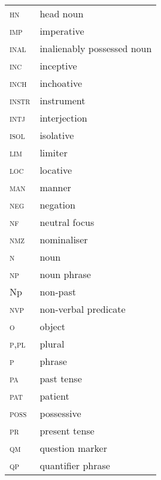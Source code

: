 \begin{multicols}{2}
\begin{tabular}{lp{4.5cm}}
\textsc{hn}          &                    head noun \\
\textsc{imp}         &                     imperative \\
\textsc{inal}        &                      inalienably possessed noun \\
\textsc{inc}         &                     inceptive \\
\textsc{inch}        &                      inchoative \\
\textsc{instr}       &                       instrument \\
\textsc{intj}        &                      interjection \\
\textsc{isol}        &                      isolative \\
\textsc{lim}         &                     limiter \\
\textsc{loc}         &                     locative \\
\textsc{man}          &                     manner \\
\textsc{neg}         &                     negation \\
\textsc{nf}           &                   neutral focus \\
\textsc{nmz}          &                    nominaliser \\
\textsc{n}            &                  noun \\
\textsc{np}           &                   noun phrase \\
Np                     &         non-past \\
\textsc{nvp}           &                   non-verbal predicate \\
\textsc{o}             &                 object \\
\textsc{p,pl}          &                     plural \\
\textsc{p}             &                 phrase \\
\textsc{pa}            &                  past tense \\
\textsc{pat}           &                   patient \\
\textsc{poss}          &                    possessive \\
\textsc{pr}            &                  present tense \\
\textsc{qm}            &                  question marker \\
\textsc{qp}            &                  quantifier phrase \\

\end{tabular}
\end{multicols}
